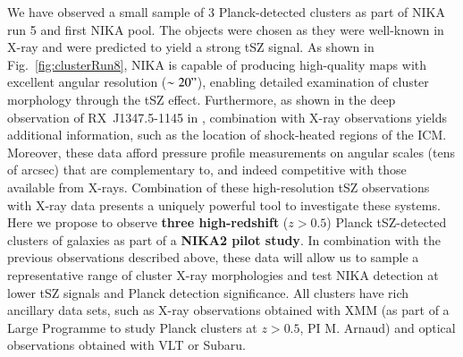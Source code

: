 \documentclass[11pt,a4paper,twoside,graphicx,color]{article}
\begin{document}
We have observed a small sample of 3 Planck-detected clusters as part of NIKA run 5 and first NIKA pool. The objects were chosen as they were well-known in X-ray and were predicted to yield a strong tSZ signal. As shown in Fig.~\ref{fig:clusterRun8}, NIKA is capable of producing high-quality maps with excellent angular resolution ($\sim 20"$), enabling detailed examination of cluster morphology through the tSZ effect. Furthermore, as shown in the deep observation of \mbox{RX~J1347.5-1145} in \cite{adam2013}, combination with X-ray observations yields additional information, such as the location of shock-heated regions of the ICM. Moreover, these data afford pressure profile measurements on angular scales (tens of arcsec) that are complementary to, and indeed competitive with those available from X-rays. Combination of these high-resolution tSZ observations with X-ray data presents a uniquely powerful tool to investigate these systems.\\

\vspace{-0.3cm} 
Here we propose to observe {\bf three high-redshift} ($z > 0.5$) Planck tSZ-detected clusters of galaxies as part of a {\bf NIKA2 pilot study}. In combination with the previous observations described above, these data will allow us to sample a representative range of cluster X-ray morphologies and test NIKA detection at lower tSZ signals and Planck detection significance. All clusters have rich ancillary data sets, such as X-ray observations obtained with XMM (as part of a Large Programme to study Planck clusters at $z>0.5$, PI M. Arnaud) and optical observations obtained with VLT or Subaru.  

%
%
%




\end{document}
